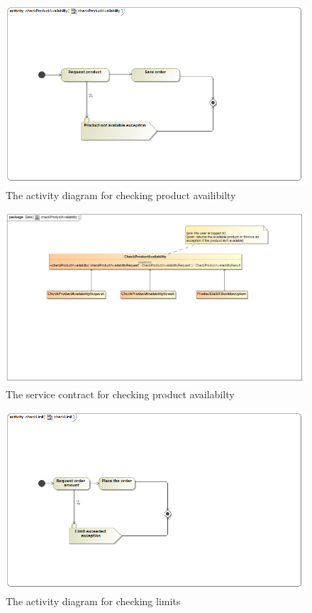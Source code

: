 \documentclass[a4paper,12pt]{article}
\begin{document}
\begin{figure}[H]
  \centering
    \includegraphics[width=1.0\textwidth]{images/checkProductAvailability.png}
    \caption{The activity diagram for checking product availibilty } 
\end{figure}

\begin{figure}[H]
	\centering
	\includegraphics[width=1.0\textwidth]{images/checkProductAvailabilitySC.jpg}
	\caption{The service contract for checking product availabilty}
\end{figure}

\begin{figure}[H]
  \centering
    \includegraphics[width=1.0\textwidth]{images/checkLimit.png}
    \caption{The activity diagram for checking limits} 
\end{figure}
\end{document}
